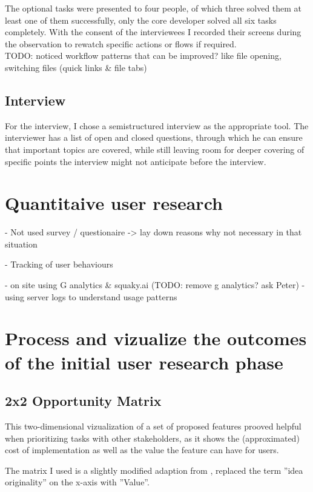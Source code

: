The optional tasks were presented to four people, of which three solved them at least one of them successfully, only the core developer solved all six tasks completely.
With the consent of the interviewees I recorded their screens during the observation to rewatch specific actions or flows if required.
\\
TODO: noticed workflow patterns that can be improved? like file opening, switching files (quick links \& file tabs)

\subsection{Interview}

For the interview, I chose a semistructured interview as the appropriate tool. The interviewer has a list of open and closed questions, through which he can ensure that important topics are covered,
while still leaving room for deeper covering of specific points the interview might not anticipate before the interview.

\section{Quantitaive user research}

- Not used survey / questionaire -> lay down reasons why not necessary in that situation

- Tracking of user behaviours

- on site using G analytics \& squaky.ai (TODO: remove g analytics? ask Peter)
- using server logs to understand usage patterns

\section{Process and vizualize the outcomes of the initial user research phase}

\subsection{2x2 Opportunity Matrix}

This two-dimensional vizualization of a set of proposed features prooved helpful when prioritizing tasks with other stakeholders,
as it shows the (approximated) cost of implementation as well as the value the feature can have for users.

The matrix I used is a slightly modified adaption from \cite[p. 181]{LearnHCI:2020ys}, replaced the term ''idea originality'' on the x-axis with ''Value''.

